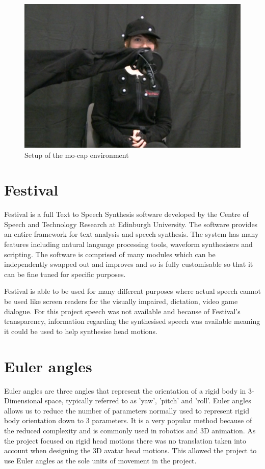 \documentclass[bsc,frontabs,twoside,singlespacing,parskip,deptreport]{infthesis}
\begin{document}
\begin{figure}[h!]
	\centering
	\includegraphics[width=.7\textwidth]{mocap.png}
	\caption{Setup of the mo-cap environment}
\end{figure}

\section{Festival}

Festival \cite{festival} is a full Text to Speech Synthesis software developed by the Centre of Speech and Technology Research at Edinburgh University. The software provides an entire framework for text analysis and speech synthesis. The system has many features including natural language processing tools, waveform synthesisers and scripting. The software is comprised of many modules which can be independently swapped out and improves and so is fully customisable so that it can be fine tuned for specific purposes. 

Festival is able to be used for many different purposes where actual speech cannot be used like screen readers for the visually impaired, dictation, video game dialogue. For this project speech was not available and because of Festival's transparency, information regarding the synthesised speech was available meaning it could be used to help synthesise head motions.

\section{Euler angles}

Euler angles are three angles that represent the orientation of a rigid body in 3-Dimensional space, typically referred to as 'yaw', 'pitch' and 'roll'. Euler angles allows us to reduce the number of parameters normally used to represent rigid body orientation down to 3 parameters. It is a very popular method because of the reduced complexity and is commonly used in robotics and 3D animation. As the project focused on rigid head motions there was no translation taken into account when designing the 3D avatar head motions. This allowed the project to use Euler angles as the sole units of movement in the project.
\end{document}
